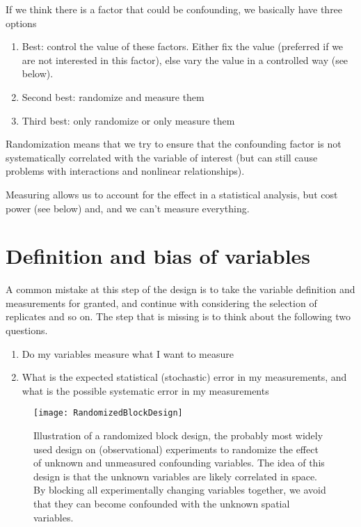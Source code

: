 \documentclass[a4paper,twoside]{tufte-book}\usepackage[]{graphicx}\usepackage[]{color}
\begin{document}
If we think there is a factor that could be confounding, we basically have three options

\begin{enumerate}
\item Best: control the value of these factors. Either fix the value (preferred if we are not interested in this factor), else vary the value in a controlled way (see below).
\item Second best: randomize and measure them
\item Third best: only randomize or only measure them
\end{enumerate}

Randomization means that we try to ensure that the confounding factor is not systematically correlated with the variable of interest (but can still cause problems with interactions and nonlinear relationships).


Measuring allows us to account for the effect in a statistical analysis, but cost power (see below) and, and we can't measure everything.

\section{Definition and bias of variables}

A common mistake at this step of the design is to take the variable definition and measurements for granted, and continue with considering the selection of replicates and so on. The step that is missing is to think about the following two questions. 

\begin{enumerate}
  \item Do my variables measure what I want to measure
  \item What is the expected statistical (stochastic) error in my measurements, and what is the possible systematic error in my measurements
\end{enumerate}

\begin{figure}[]
\begin{center}
\texttt{[image: RandomizedBlockDesign]}
\caption{Illustration of a randomized block design, the probably most widely used design on (observational) experiments to randomize the effect of unknown and unmeasured confounding variables. The idea of this design is that the unknown variables are likely correlated in space. By blocking all experimentally changing variables together, we avoid that they can become confounded with the unknown spatial variables.}
\label{fig: RandomizedBlockDesign}
\end{center}
\end{figure}
\end{document}
